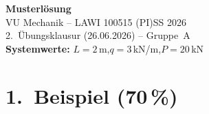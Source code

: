 \documentclass[a4paper,11pt]{article}
\begin{document}

\begin{center}
  {\Large\bfseries Musterlösung}\\[4pt]
  {\large VU Mechanik -- LAWI 100515 (PI)\quad SS 2026}\\[2pt]
  {\normalsize 2.~Übungsklausur (26.06.2026) -- Gruppe~A}\\[2pt]
  {\normalsize \textbf{Systemwerte:} $L = 2$\,m,\quad $q = 3$\,kN/m,\quad $P = 20$\,kN}
\end{center}

\section*{1.~Beispiel \hfill (70\,\%)}
\end{document}
